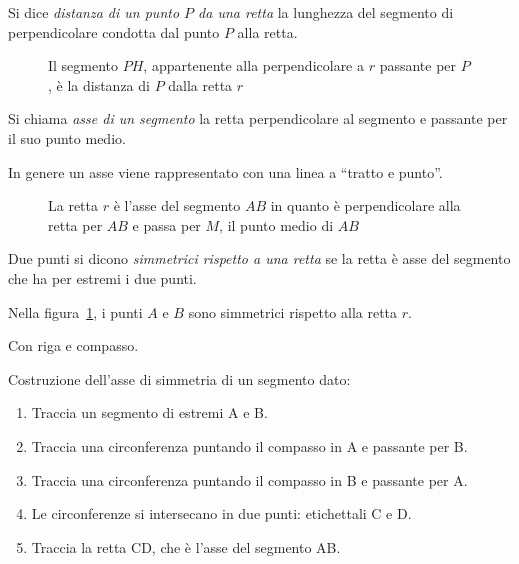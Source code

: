 \begin{definizione}
Si dice \emph{distanza di un punto $P$ da una retta} la lunghezza del 
segmento di perpendicolare condotta dal punto $P$ alla retta.
\end{definizione}

\begin{inaccessibleblock}
 \begin{figure}[htb]
\centering
\caption{Il segmento $PH$, appartenente alla perpendicolare a $r$ 
passante per $P$, è la distanza di $P$ dalla retta $r$}
\end{figure}
\end{inaccessibleblock}

\begin{definizione}\label{def:asse_segmento}
Si chiama \emph{asse di un segmento} la retta perpendicolare al 
segmento e passante per il suo punto medio.
\end{definizione}

In genere un asse viene rappresentato con una linea a ``tratto e 
punto''.

\begin{inaccessibleblock}
 \begin{figure}[htb]
\centering
\caption{La retta $r$ è l'asse del segmento $AB$ in quanto è 
perpendicolare alla retta per $AB$ e passa per $M$, il punto medio di 
$AB$}\label{fig:1.38}
\end{figure}
\end{inaccessibleblock}

\begin{definizione}
Due punti si dicono \emph{simmetrici rispetto a una retta} se la 
retta è asse del segmento che ha per estremi i due punti.
\end{definizione}

Nella figura~\ref{fig:1.38}, i punti $A$ e $B$ sono simmetrici 
rispetto alla retta $r$.

Con riga e compasso.

\begin{procedura}\label{proc:fonda_asse}
  Costruzione dell'asse di simmetria di un segmento dato:
  \begin{enumerate} [nosep]
    \item 
    Traccia un segmento di estremi A e B.
    \item 
    Traccia una circonferenza puntando il compasso in A e passante per B.
    \item 
    Traccia una circonferenza puntando il compasso in B e passante per A.  
    \item 
    Le circonferenze si intersecano in due punti: etichettali C e D.
    \item 
    Traccia la retta CD, che è l'asse del segmento AB.
  \end{enumerate}
\end{procedura}

